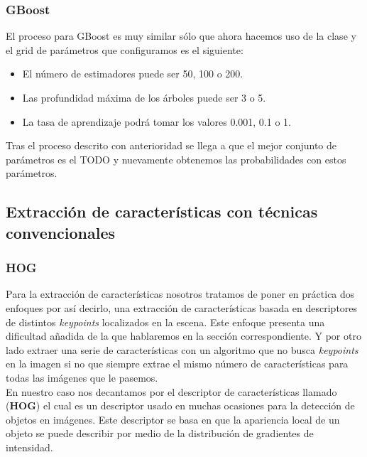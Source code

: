 \subsubsection{GBoost}

El proceso para GBoost es muy similar sólo que ahora hacemos uso de la clase  y el grid de parámetros que configuramos es el siguiente:

\begin{itemize}
\item El número de estimadores puede ser 50, 100 o 200.
\item Las profundidad máxima de los árboles puede ser 3 o 5.
\item La tasa de aprendizaje podrá tomar los valores 0.001, 0.1 o 1.
\end{itemize}

Tras el proceso descrito con anterioridad se llega a que el mejor conjunto de parámetros es el TODO y nuevamente obtenemos las probabilidades con estos parámetros.

\subsection{Extracción de características con técnicas convencionales}

\subsubsection{HOG}

Para la extracción de características nosotros tratamos de poner en práctica dos enfoques por así decirlo, una extracción de características basada en descriptores de distintos \textit{keypoints} localizados en la escena. Este enfoque presenta una dificultad añadida de la que hablaremos en la sección correspondiente. Y por otro lado extraer una serie de características con un algoritmo que no busca \textit{keypoints} en la imagen si no que siempre extrae el mismo número de características para todas las imágenes que le pasemos.\\

En nuestro caso nos decantamos por el descriptor de características llamado  (\textbf{HOG}) el cual es un descriptor usado en muchas ocasiones para la detección de objetos en imágenes. Este descriptor se basa en que la apariencia local de un objeto se puede describir por medio de la distribución de gradientes de intensidad.\\

